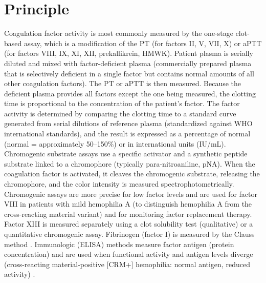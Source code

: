 \section*{Principle}
Coagulation factor activity is most commonly measured by the one-stage clot-based assay, which is a modification of the PT (for factors II, V, VII, X) or aPTT (for factors VIII, IX, XI, XII, prekallikrein, HMWK). Patient plasma is serially diluted and mixed with factor-deficient plasma (commercially prepared plasma that is selectively deficient in a single factor but contains normal amounts of all other coagulation factors). The PT or aPTT is then measured. Because the deficient plasma provides all factors except the one being measured, the clotting time is proportional to the concentration of the patient's factor. The factor activity is determined by comparing the clotting time to a standard curve generated from serial dilutions of reference plasma (standardized against WHO international standards), and the result is expressed as a percentage of normal (normal = approximately 50--150\%) or in international units (IU/mL). Chromogenic substrate assays use a specific activator and a synthetic peptide substrate linked to a chromophore (typically para-nitroaniline, pNA). When the coagulation factor is activated, it cleaves the chromogenic substrate, releasing the chromophore, and the color intensity is measured spectrophotometrically. Chromogenic assays are more precise for low factor levels and are used for factor VIII in patients with mild hemophilia A (to distinguish hemophilia A from the cross-reacting material variant) and for monitoring factor replacement therapy. Factor XIII is measured separately using a clot solubility test (qualitative) or a quantitative chromogenic assay. Fibrinogen (factor I) is measured by the Clauss method \cite{tietz2023textbook}. Immunologic (ELISA) methods measure factor antigen (protein concentration) and are used when functional activity and antigen levels diverge (cross-reacting material-positive [CRM+] hemophilia: normal antigen, reduced activity) \cite{diminno2018measurement}.

